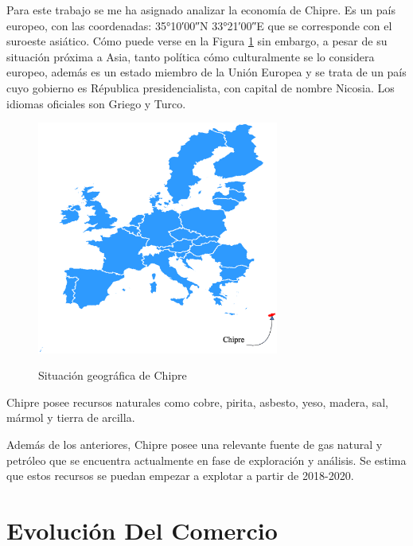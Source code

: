 \documentclass[a4paper,openright,12pt]{book}
\begin{document}
Para este trabajo se me ha asignado analizar la economía de Chipre. Es un país europeo, con las coordenadas: 35°10′00″N 33°21′00″E que se corresponde con el suroeste asiático. Cómo puede verse en la Figura \ref{fig1} sin embargo, a pesar de su situación próxima a Asia, tanto política cómo culturalmente se lo considera europeo, además es un estado miembro de la Unión Europea y se trata de un país cuyo gobierno es Républica presidencialista, con capital de nombre Nicosia. Los idiomas oficiales son Griego y Turco.

\begin{figure}[htb]
    \centering
    \caption{Situación geográfica de Chipre}
    \includegraphics[width=300px]{imgs/mapa.eps}
    \label{fig1}
\end{figure}

Chipre posee recursos naturales como cobre, pirita, asbesto, yeso, madera, sal, mármol y tierra de arcilla.

Además de los anteriores, Chipre posee una relevante fuente de gas natural y petróleo que se encuentra actualmente en fase de exploración y análisis. Se estima que estos recursos se puedan empezar a explotar a partir de 2018-2020.



\chapter{Evolución Del Comercio}
\label{cap2}
\end{document}
